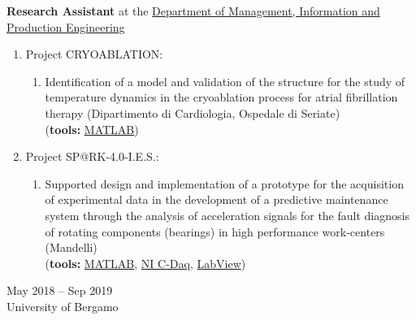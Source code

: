 \documentclass[10pt]{article}
\begin{document}
\noindent
\begin{minipage}[t]{.8\textwidth}
	\raggedright
	\textbf{Research Assistant} at the \href{https://digip.unibg.it/}{Department of Management, Information and Production Engineering}
	\begin{enumerate}
		\item Project CRYOABLATION:
		\begin{enumerate}
			\item Identification of a model and validation of the structure for the study of temperature dynamics in the cryoablation process for atrial fibrillation therapy ({\small Dipartimento di Cardiologia, Ospedale di Seriate})\\
			({\scriptsize \textbf{tools:} \href{https://www.mathworks.com/products/matlab.html}{MATLAB}})
		\end{enumerate}
		\item Project SP@RK-4.0-I.E.S.:
		\begin{enumerate}
			\item Supported design and implementation of a prototype for the acquisition of experimental data in the development of a predictive maintenance system through the analysis of acceleration signals for the fault diagnosis of rotating components (bearings) in high performance work-centers ({\small Mandelli})\\
			({\scriptsize \textbf{tools:} \href{https://www.mathworks.com/products/matlab.html}{MATLAB}, \href{https://www.ni.com/it-it/shop/data-acquisition.html}{NI C-Daq}, \href{https://www.ni.com/it-it/shop/labview.html}{LabView}})
		\end{enumerate}
  \end{enumerate}
\end{minipage}%
\hfill\vrule\hfill
\begin{minipage}[t]{.16\textwidth}
	\raggedleft
	May 2018 – Sep 2019\\
	{\small University of Bergamo}
\end{minipage}

\end{document}
